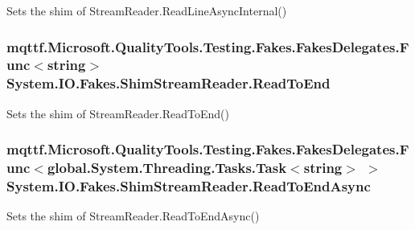 Sets the shim of Stream\-Reader.\-Read\-Line\-Async\-Internal()

\hypertarget{class_system_1_1_i_o_1_1_fakes_1_1_shim_stream_reader_a9ee18356e50153a59737ff2d23a05edc}{
\subsubsection[{Read\-To\-End}]{\setlength{\rightskip}{0pt plus 5cm}mqttf.\-Microsoft.\-Quality\-Tools.\-Testing.\-Fakes.\-Fakes\-Delegates.\-Func$<$string$>$ System.\-I\-O.\-Fakes.\-Shim\-Stream\-Reader.\-Read\-To\-End\hspace{0.3cm}{\ttfamily [set]}}}\label{class_system_1_1_i_o_1_1_fakes_1_1_shim_stream_reader_a9ee18356e50153a59737ff2d23a05edc}


Sets the shim of Stream\-Reader.\-Read\-To\-End()

\hypertarget{class_system_1_1_i_o_1_1_fakes_1_1_shim_stream_reader_a69b9624df78dc3ebda74bfa6261df762}{
\subsubsection[{Read\-To\-End\-Async}]{\setlength{\rightskip}{0pt plus 5cm}mqttf.\-Microsoft.\-Quality\-Tools.\-Testing.\-Fakes.\-Fakes\-Delegates.\-Func$<$global.\-System.\-Threading.\-Tasks.\-Task$<$string$>$ $>$ System.\-I\-O.\-Fakes.\-Shim\-Stream\-Reader.\-Read\-To\-End\-Async\hspace{0.3cm}{\ttfamily [set]}}}\label{class_system_1_1_i_o_1_1_fakes_1_1_shim_stream_reader_a69b9624df78dc3ebda74bfa6261df762}


Sets the shim of Stream\-Reader.\-Read\-To\-End\-Async()

